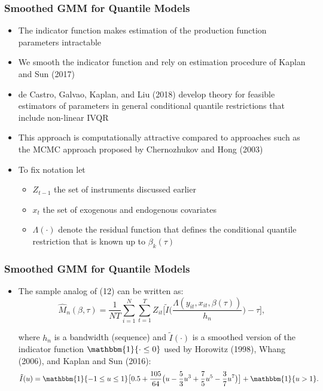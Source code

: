 \documentclass{beamer}
\begin{document}
\begin{frame}
\begin{itemize}
\begin{frame}
\begin{itemize}
\begin{frame}
\end{frame}

\begin{frame}
\frametitle{Smoothed GMM for Quantile Models}
\begin{itemize}
	\item The indicator function makes estimation of the production function parameters intractable
	\item We smooth the indicator function and rely on estimation procedure of Kaplan and Sun (2017)
	\item de Castro, Galvao, Kaplan, and Liu (2018) develop theory for feasible estimators of parameters in general conditional quantile restrictions that include non-linear IVQR
	\item This approach is computationally attractive compared to approaches such as the MCMC approach proposed by Chernozhukov and Hong (2003)
	
	\item To fix notation let
	\begin{itemize}
		\item $Z_{t-1}$ the set of instruments discussed earlier
		\item $x_{t}$ the set of exogenous and endogenous covariates
		\item $\Lambda(\cdot)$ denote the residual function that defines the conditional quantile restriction that is known up to $\beta_{k}(\tau)$
	\end{itemize}
	
\end{itemize}
\end{frame}

\begin{frame}
\frametitle{Smoothed GMM for Quantile Models}
\begin{itemize}
	\item The sample analog of (12) can be written as:
	\begin{equation}
    \hat{M}_{n}(\beta, \tau)=\frac{1}{NT}\sum_{i=1}^{N}\sum_{t=1}^{T}Z_{it}\Bigg[\tilde{I}\Bigg(\frac{\Lambda(y_{it}, x_{it}, \beta(\tau))}{h_{n}}\Bigg)-\tau\Bigg],
	\end{equation}
	
	where $h_{n}$ is a bandwidth (sequence) and $\tilde{I}(\cdot)$ is a smoothed version of the indicator function $\mathbbm{1}\{\cdot \leq 0\}$ used by Horowitz (1998), Whang (2006), and Kaplan and Sun (2016):
	\begin{equation}
	    \tilde{I}(u)=\mathbbm{1}\{-1\leq u \leq 1\}\big[0.5+\frac{105}{64}\big(u-\frac{5}{3}u^{3}+\frac{7}{5}u^{5}- \frac{3}{7}u^{7}\big)\big]+\mathbbm{1}\{u>1\}.
	\end{equation}
	

\end{itemize}
\end{frame}
\end{itemize}
\end{frame}
\end{itemize}
\end{frame}
\end{document}
